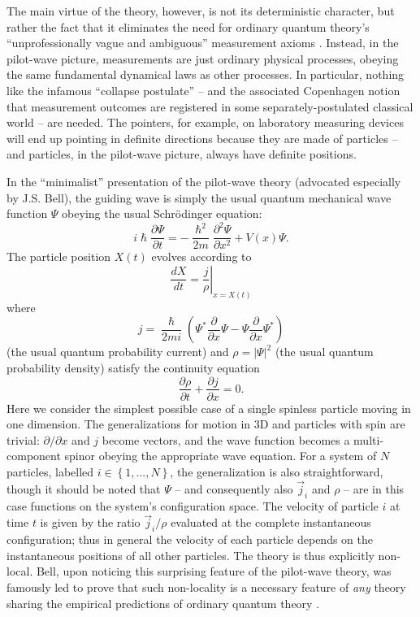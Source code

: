 \documentclass[aps,prc,onecolumn,letterpaper,floatfix,12pt]{revtex4}
\renewcommand{\hbar}{\hslash}
\begin{document}
The main virtue of the theory, however, is not its deterministic
character, but rather the fact that it eliminates the need for
ordinary quantum theory's 
``unprofessionally vague and ambiguous'' measurement axioms \cite{bellqft}.   Instead, in the
pilot-wave picture, measurements are just ordinary physical processes,
obeying the same fundamental dynamical laws as other processes.  In
particular, nothing like the infamous ``collapse postulate'' -- and the associated
Copenhagen notion that measurement outcomes are registered in some
separately-postulated classical world -- are needed.  The pointers, for
example, on laboratory measuring devices will end up pointing in
definite directions because they are made of particles -- and
particles, in the pilot-wave picture, always have definite positions.

In the ``minimalist'' presentation of the pilot-wave theory
(advocated especially by J.S. Bell), the guiding wave is simply the
usual quantum mechanical wave function $\Psi$ 
obeying the usual Schr\"odinger equation:
\begin{equation}
i \hbar \frac{\partial \Psi}{\partial t} = - \frac{\hbar^2}{2m}
\frac{\partial^2 \Psi}{\partial x^2} + V(x) \Psi.
\end{equation}
The particle position $X(t)$ evolves according to
\begin{equation}
\frac{dX}{dt} = \left. \frac{j}{\rho} \right|_{x=X(t)} 
\label{dBBvel}
\end{equation}
where 
\begin{equation}
j = \frac{\hbar}{2mi}(\Psi^* \frac{\partial}{\partial x} \Psi - \Psi
\frac{\partial}{\partial x} \Psi^*)
\label{jdef}
\end{equation}
(the usual quantum probability current) and  $\rho = |\Psi|^2$
(the usual quantum probability density) satisfy the continuity
equation
\begin{equation}
\frac{\partial \rho}{\partial t} + \frac{\partial j}{\partial x}  = 0.
\label{continuity}
\end{equation}
Here we consider the simplest possible case of a single spinless particle
moving in one dimension.  The generalizations for motion in 3D and
particles with spin are trivial:  $\partial/\partial x$ and $j$ become
vectors, and the wave function becomes a multi-component
spinor obeying the appropriate wave equation.  For a system of $N$
particles, labelled $i \in \left\{1, ..., N\right\}$,
the generalization is also straightforward, though it should be noted
that $\Psi$ -- and consequently also $\vec{j}_i$ and $\rho$ -- are in this case
functions on the system's configuration space.  The velocity of particle $i$ at
time $t$ is given by the ratio $\vec{j}_i / \rho$ evaluated at the complete
instantaneous configuration; thus in general the velocity of each
particle depends on the instantaneous positions of all other
particles.  The theory is thus explicitly non-local.  Bell, upon
noticing this surprising feature of the pilot-wave theory, was
famously led to
prove that such non-locality is a necessary feature of \emph{any} theory
sharing the empirical predictions of ordinary quantum
theory \cite{belltheorem}. 
\end{document}
